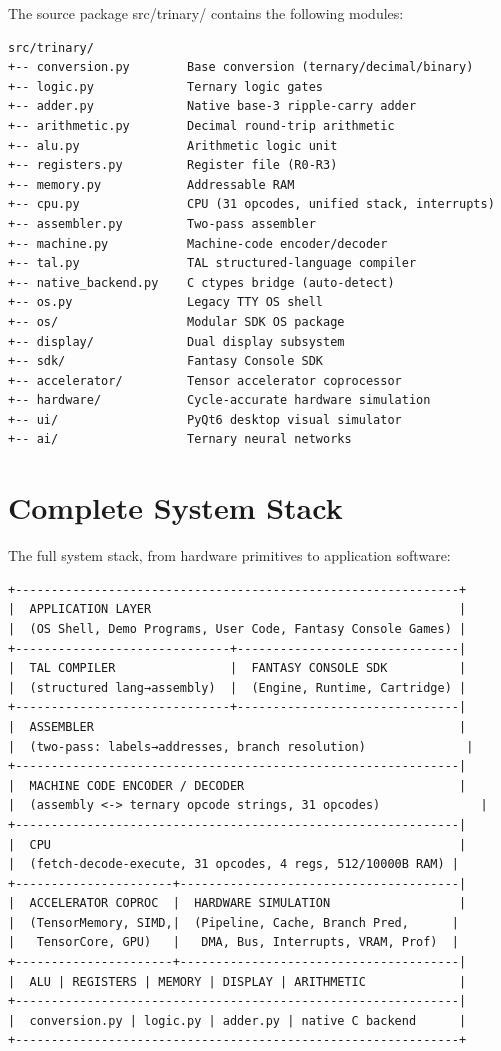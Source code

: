 \documentclass[12pt,a4paper,twoside]{book}
\theoremstyle{trinarytheorem}
\theoremstyle{trinarydefinition}
\newcommand{\code}[1]{\textsf{#1}}
\begin{document}
The source package \code{src/trinary/} contains the following modules:

\begin{verbatim}
src/trinary/
+-- conversion.py        Base conversion (ternary/decimal/binary)
+-- logic.py             Ternary logic gates
+-- adder.py             Native base-3 ripple-carry adder
+-- arithmetic.py        Decimal round-trip arithmetic
+-- alu.py               Arithmetic logic unit
+-- registers.py         Register file (R0-R3)
+-- memory.py            Addressable RAM
+-- cpu.py               CPU (31 opcodes, unified stack, interrupts)
+-- assembler.py         Two-pass assembler
+-- machine.py           Machine-code encoder/decoder
+-- tal.py               TAL structured-language compiler
+-- native_backend.py    C ctypes bridge (auto-detect)
+-- os.py                Legacy TTY OS shell
+-- os/                  Modular SDK OS package
+-- display/             Dual display subsystem
+-- sdk/                 Fantasy Console SDK
+-- accelerator/         Tensor accelerator coprocessor
+-- hardware/            Cycle-accurate hardware simulation
+-- ui/                  PyQt6 desktop visual simulator
+-- ai/                  Ternary neural networks
\end{verbatim}

\section{Complete System Stack}

The full system stack, from hardware primitives to application software:

\begin{verbatim}
+--------------------------------------------------------------+
|  APPLICATION LAYER                                           |
|  (OS Shell, Demo Programs, User Code, Fantasy Console Games) |
+------------------------------+-------------------------------|
|  TAL COMPILER                |  FANTASY CONSOLE SDK          |
|  (structured lang→assembly)  |  (Engine, Runtime, Cartridge) |
+------------------------------+-------------------------------|
|  ASSEMBLER                                                   |
|  (two-pass: labels→addresses, branch resolution)              |
+--------------------------------------------------------------|
|  MACHINE CODE ENCODER / DECODER                              |
|  (assembly <-> ternary opcode strings, 31 opcodes)              |
+--------------------------------------------------------------|
|  CPU                                                         |
|  (fetch-decode-execute, 31 opcodes, 4 regs, 512/10000B RAM) |
+----------------------+---------------------------------------|
|  ACCELERATOR COPROC  |  HARDWARE SIMULATION                  |
|  (TensorMemory, SIMD,|  (Pipeline, Cache, Branch Pred,      |
|   TensorCore, GPU)   |   DMA, Bus, Interrupts, VRAM, Prof)  |
+----------------------+---------------------------------------|
|  ALU | REGISTERS | MEMORY | DISPLAY | ARITHMETIC             |
+--------------------------------------------------------------|
|  conversion.py | logic.py | adder.py | native C backend      |
+--------------------------------------------------------------+
\end{verbatim}
\end{document}
